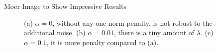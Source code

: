 \begin{frame}{Moer Image to Show Impressive Results}
    \begin{figure}
        \caption{(a) $\alpha = 0$, without any one norm penalty, is not robust to the additional noise. (b) $\alpha = 0.01$, there is a tiny amount of $\lambda$. (c) $\alpha = 0.1$, it is more penalty compared to (a).}
        \label{fig:alto_deblurred}
    \end{figure}

\end{frame}